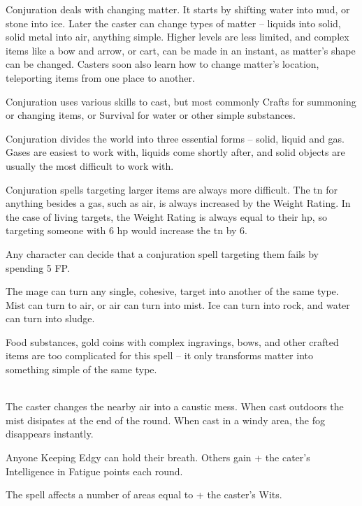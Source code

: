 \documentclass[titlepage,a4paper,openany]{book}
\begin{document}

\begin{multicols}{2}

Conjuration deals with changing matter.
It starts by shifting water into mud, or stone into ice.  Later the caster can change types of matter -- liquids into solid, solid metal into air, anything simple.
Higher levels are less limited, and complex items like a bow and arrow, or cart, can be made in an instant, as matter's shape can be changed.  Casters soon also learn how to change matter's location, teleporting items from one place to another.

Conjuration uses various skills to cast, but most commonly Crafts for summoning or changing items, or Survival for water or other simple substances.

Conjuration divides the world into three essential forms -- solid, liquid and gas.  Gases are easiest to work with, liquids come shortly after, and solid objects are usually the most difficult to work with.

Conjuration spells targeting larger items are always more difficult.  The \gls{tn} for anything besides a gas, such as air, is always increased by the Weight Rating.  In the case of living targets, the Weight Rating is always equal to their \gls{hp}, so targeting someone with 6 \gls{hp} would increase the \gls{tn} by 6.

Any character can decide that a conjuration spell targeting them fails by spending 5 FP.

\spelllevel

The mage can turn any single, cohesive, target into another of the same type.  Mist can turn to air, or air can turn into mist.
Ice can turn into rock, and water can turn into sludge.

Food substances, gold coins with complex ingravings, bows, and other crafted items are too complicated for this spell -- it only transforms matter into something simple of the same type.

\\
The caster changes the nearby air into a caustic mess.  When cast outdoors the mist disipates at the end of the \gls{round}.  When cast in a windy area, the fog disappears instantly.

Anyone Keeping Edgy can hold their breath.  Others gain  + the cater's Intelligence in Fatigue points each \gls{round}.

The spell affects a number of areas equal to  + the caster's Wits.


\end{multicols}
\end{document}
